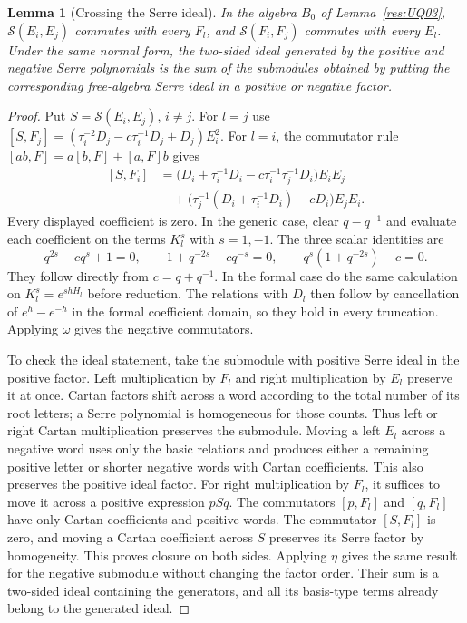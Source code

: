 \documentclass[11pt,oneside,openany]{book}
\newtheorem{lemma}[theorem]{Lemma}
\theoremstyle{definition}
\theoremstyle{remark}
\begin{document}
\begin{lemma}[Crossing the Serre ideal]
\label{res:UQ04}
In the algebra \(B_0\) of Lemma~\ref{res:UQ03},
\(\mathcal S(E_i,E_j)\) commutes with every \(F_l\), and
\(\mathcal S(F_i,F_j)\) commutes with every \(E_l\).
Under the same normal form, the two-sided ideal generated
by the positive and negative Serre polynomials is the sum
of the submodules obtained by putting the corresponding
free-algebra Serre ideal in a positive or negative factor.
\end{lemma}
\begin{proof}
Put \(S=\mathcal S(E_i,E_j)\), \(i\ne j\).
For \(l=j\) use
\(
 [S,F_j]=(\tau_i^{-2}D_j-c\tau_i^{-1}D_j+D_j)E_i^2.
\)
For \(l=i\), the commutator rule
\([ab,F]=a[b,F]+[a,F]b\) gives
\[
\begin{split}
 [S,F_i]
 &=\bigl(D_i+\tau_i^{-1}D_i-c\tau_i^{-1}\tau_j^{-1}D_i\bigr)E_iE_j\\
 &\quad+\bigl(\tau_j^{-1}(D_i+\tau_i^{-1}D_i)-cD_i\bigr)E_jE_i .
\end{split}
\]
Every displayed coefficient is zero. In the generic case,
clear \(q-q^{-1}\) and evaluate each coefficient on
the terms \(K_l^s\) with \(s=1,-1\).
The three scalar identities are
\[
 q^{2s}-c q^s+1=0,\qquad
 1+q^{-2s}-c q^{-s}=0,\qquad
 q^s(1+q^{-2s})-c=0 .
\]
They follow directly from \(c=q+q^{-1}\).
In the formal case do the same calculation on
\(K_l^s=e^{shH_l}\) before reduction.
The relations with \(D_l\) then follow by cancellation
of \(e^h-e^{-h}\) in the formal coefficient domain,
so they hold in every truncation. Applying \(\omega\)
gives the negative commutators.

To check the ideal statement, take the submodule with
positive Serre ideal in the positive factor. Left
multiplication by \(F_l\) and right multiplication by \(E_l\)
preserve it at once. Cartan factors shift across a word
according to the total number of its root letters; a Serre
polynomial is homogeneous for those counts.
Thus left or right Cartan multiplication preserves
the submodule. Moving a left \(E_l\) across a negative
word uses only the basic relations and produces either
a remaining positive letter or shorter negative words
with Cartan coefficients. This also preserves the positive
ideal factor. For right multiplication by \(F_l\), it
suffices to move it across a positive expression \(pSq\).
The commutators \([p,F_l]\) and \([q,F_l]\) have only
Cartan coefficients and positive words. The commutator
\([S,F_l]\) is zero, and moving a Cartan coefficient
across \(S\) preserves its Serre factor by homogeneity.
This proves closure on both sides. Applying \(\eta\) gives
the same result for the negative submodule without changing
the factor order. Their sum is a two-sided ideal containing
the generators, and all its basis-type terms already
belong to the generated ideal.
\end{proof}
\end{document}
